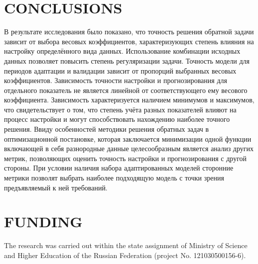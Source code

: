 \documentclass{article}
\begin{document}
\section{CONCLUSIONS}

В результате исследования было показано, что точность решения обратной задачи зависит от выбора весовых коэффициентов, характеризующих степень влияния на настройку определённого вида данных. Использование комбинации исходных данных позволяет повысить степень регуляризации задачи. Точность модели для периодов адаптации и валидации зависит от пропорций выбранных весовых коэффициентов. Зависимость точности настройки и прогнозирования для отдельного показатель не является линейной от соответствующего ему весового коэффициента. Зависимость характеризуется наличием минимумов и максимумов, что свидетельствует о том, что степень учёта разных показателей влияют на процесс настройки и могут способствовать нахождению наиболее точного решения. Ввиду особенностей методики решения обратных задач в оптимизационной постановке, которая заключается минимизации одной функции включающей в себя разнородные данные целесообразным является анализ других метрик, позволяющих оценить точность настройки и прогнозирования с другой стороны. При условии наличия набора адаптированных моделей сторонние метрики позволят выбрать наиболее подходящую модель с точки зрения предъявляемый к ней требований.


\section{FUNDING}
The research was carried out within the state assignment of Ministry of Science and Higher Education of the Russian Federation (project No. 121030500156-6).
\end{document}
